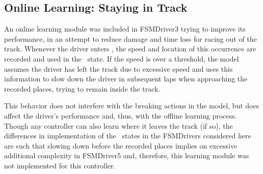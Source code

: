 


\subsection{Online Learning: Staying in Track}%
An online learning module was included in FSMDriver3 trying to improve its performance, in an attempt to reduce damage and time loss for racing out of the track. Whenever the driver enters \OT, the speed and location of this occurrence are recorded and used in the \racing~state. If the speed is over a threshold, the model assumes the driver has left the track due to excessive speed and uses this information to slow down the driver in subsequent laps when approaching the recorded places, trying to remain inside the track.

This behavior does not interfere with the breaking actions in the model, but does affect the driver's performance and, thus, with the offline learning process. Though any controller can also learn where it leaves the track (if so), the differences in implementation of the \racing~states in the FSMDrivers considered here are such that slowing down before the recorded places implies on excessive additional complexity in FSMDriver5 and, therefore, this learning module was not implemented for this controller.